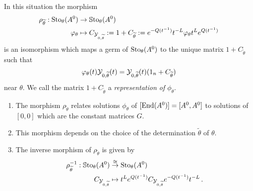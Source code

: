 \begin{prop} \label{prop:representation}
  In this situation the morphism
  \begin{align*}
    \rho_{\widetilde\theta}:\operatorname{Sto}_\theta(A^0)&\to\operatorname{\mathbb{S}to}_\theta(A^0)
    \\\varphi_\theta
    &\mapsto
    C_{\mathcal{Y}_{0,\widetilde\theta}}
    :=1+C_{\widetilde\theta}
    :=e^{-Q(t^{-1})}t^{-L} \varphi_\theta t^L e^{Q(t^{-1})}
  \end{align*}
  is an isomorphism which maps a germ of $\operatorname{Sto}_\theta(A^0)$ to the unique
  matrix $1+C_{\tilde\theta}$ such that
  \begin{equation} \label{eq:representation}
    \varphi_\theta(t)\mathcal{Y}_{0,\widetilde\theta}(t)
    =\mathcal{Y}_{0,\widetilde\theta}(t)(1_n+C_{\widetilde\theta})
  \end{equation}
  near $\theta$.  We call the matrix $1+C_{\tilde\theta}$ a
  \emph{representation of $\phi_\theta$}.
  \begin{s-rem}
    \begin{enumerate}
      \item {}
        The morphism $\rho_{\tilde\theta}$ relates solutions $\phi_\theta$ of
        $[\operatorname{End}(A^0)]=[A^0,A^0]$ to solutions of $[0,0]$ which are the constant
        matrices $G$.
      \item This morphism depends on the choice of the determination
        $\tilde\theta$ of $\theta$.
      \item The inverse morphism of $\rho_{\tilde\theta}$ is given by
        \begin{align*}
          \rho_{\widetilde\theta}^{-1}:
          \operatorname{\mathbb{S}to}_\theta(A^0)
          &\overset{\cong}\to
          \operatorname{Sto}_\theta(A^0)
          \\C_{\mathcal{Y}_{0,\widetilde\theta}} &\mapsto
          t^{L}e^{Q(t^{-1})}C_{\mathcal{Y}_{0,\widetilde\theta}} e^{-Q(t^{-1})}t^{-L} \,.
        \end{align*}
    \end{enumerate}
  \end{s-rem}
\end{prop}
